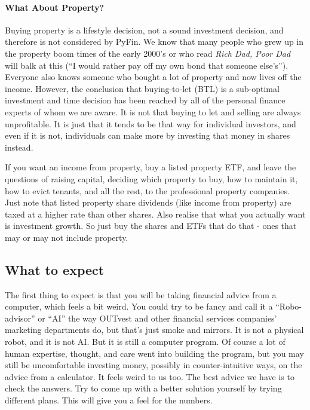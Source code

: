 \documentclass[a4paper, justified]{tufte-handout}
\begin{document}
\paragraph{What About Property?}
Buying property is a lifestyle decision, not a sound investment decision, and therefore is not considered by PyFin. We know that many people who grew up in the property boom times of the early 2000's or who read \textit{Rich Dad, Poor Dad} will balk at this (``I would rather pay off my own bond that someone else's''). Everyone also knows someone who bought a lot of property and now lives off the income. However, the conclusion that buying-to-let (BTL) is a sub-optimal investment and time decision has been reached by all of the personal finance experts of whom we are aware. It is not that buying to let and selling are always unprofitable. It is just that it tends to be that way for individual investors, and even if it is not, individuals can make more by investing that money in shares instead. 

If you want an income from property, buy a listed property ETF, and leave the questions of raising capital, deciding which property to buy, how to maintain it, how to evict tenants, and all the rest, to the professional property companies. Just note that listed property share dividends (like income from property) are taxed at a higher rate than other shares. Also realise that what you actually want is investment growth. So just buy the shares and ETFs that do that - ones that may or may not include property.

\subsection{What to expect}
The first thing to expect is that you will be taking financial advice from a computer, which feels a bit weird. You could try to be fancy and call it a ``Robo-advisor'' or ``AI'' the way OUTvest and other financial services companies' marketing departments do, but that's just smoke and mirrors. It is not a physical robot, and it is not AI. But it is still a computer program. Of course a lot of human expertise, thought, and care went into building the program, but you may still be uncomfortable investing money, possibly in counter-intuitive ways, on the advice from a calculator. It feels weird to us too. The best advice we have is to check the answers. Try to come up with a better solution yourself by trying different plans. This will give you a feel for the numbers.
\end{document}
